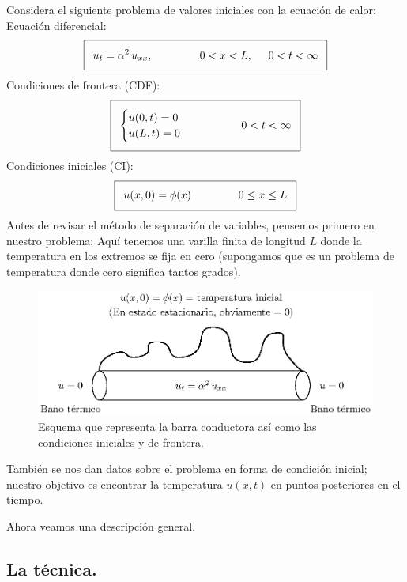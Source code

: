 Considera el siguiente problema de valores iniciales con la ecuación de calor:
\\
Ecuación diferencial:
\begin{align*}
\addtolength{\fboxsep}{5pt}\boxed{ u_{t} = \alpha^{2} \, u_{xx}, \hspace{1.5cm} 0 < x < L,\hspace{0.5cm} 0 < t < \infty}
\end{align*}
Condiciones de frontera (CDF):
\begin{align*}
\addtolength{\fboxsep}{5pt}\boxed{
\begin{cases}
u(0, t) = 0 \\
u(L, t) = 0
\end{cases}
\hspace{1.5cm}
0 < t < \infty }
\end{align*}
Condiciones iniciales (CI):
\begin{align*}
\addtolength{\fboxsep}{5pt}\boxed{
u(x, 0) = \phi (x) \hspace{1.5cm} 0 \leq x \leq L
}
\end{align*}
Antes de revisar el método de separación de variables, pensemos primero en nuestro problema: Aquí tenemos una varilla finita de longitud $L$ donde la temperatura en los extremos se fija en cero (supongamos que es un problema de temperatura donde cero significa tantos grados). 
\begin{figure}[H]
    \centering
    \includegraphics[scale=1.3]{Imagenes/Separacion_Variables_00_Barra.eps}
    \caption{Esquema que representa la barra conductora así como las condiciones iniciales y de frontera.}
    \label{fig:figura_barra_01}
\end{figure}

También se nos dan datos sobre el problema en forma de condición inicial; nuestro objetivo es encontrar la temperatura $u (x, t)$ en puntos posteriores en el tiempo.

Ahora veamos una descripción general.

\subsection{La técnica.}

